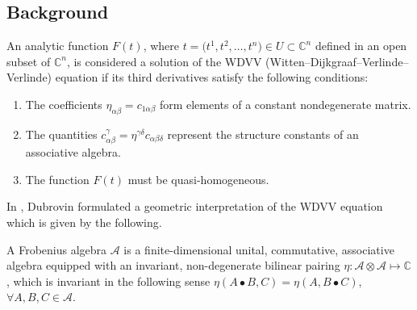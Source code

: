 \documentclass[11pt]{article}
\numberwithin{equation}{section}
\numberwithin{equation}{section}
\begin{document}
\subsection{Background}

\begin{Definition}
An analytic function $F(t)$, where $t = \bigl(t^1, t^2, \dots, t^n\bigr) \in U \subset \mathbb{C}^n$ defined in an open subset of $\mathbb{C}^n$, is considered a solution of the WDVV (Witten--Dijkgraaf--Verlinde--Verlinde) equation if its third derivatives
satisfy the following conditions:
\begin{enumerate}\itemsep=0pt
\item[(1)] The coefficients $\eta_{\alpha\beta} = c_{1\alpha\beta}$ form elements of a constant nondegenerate matrix.
\item[(2)] The quantities $c_{\alpha\beta}^{\gamma} = \eta^{\gamma\delta} c_{\alpha\beta\delta}$ represent the structure constants of an associative algebra.
\item[(3)] The function $F(t)$ must be quasi-homogeneous.
\end{enumerate}
\end{Definition}


In \cite[Chapter~1]{B.Dubrovin2}, Dubrovin formulated a geometric interpretation of the WDVV equation which is given by the following.

\begin{Definition}
A Frobenius algebra $\mathcal{A}$ is a finite-dimensional unital, commutative, associative algebra equipped with an invariant, non-degenerate bilinear pairing
$
\eta \colon \mathcal{A} \otimes \mathcal{A} \mapsto \mathbb{C}$,
which is invariant in the following sense
$
\eta(A \bullet B, C) = \eta(A, B \bullet C)$, $ \forall A, B, C \in \mathcal{A}$.
\end{Definition}
\end{document}
